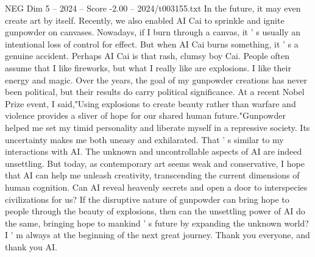 \begin{textsample}{NEG Dim 5 – 2024 – Score -2.00 – 2024/t003155.txt}
In the future, it may even create art by itself.
Recently, we also enabled AI Cai to sprinkle and ignite gunpowder on canvases.
Nowadays, if I burn through a canvas, it ' s usually an intentional loss of control for effect.
But when AI Cai burns something, it ' s a genuine accident.
Perhaps AI Cai is that rash, clumsy boy Cai.
People often assume that I like fireworks, but what I really like are explosions.
I like their energy and magic.
Over the years, the goal of my gunpowder creations has never been political, but their results do carry political significance.
At a recent Nobel Prize event, I said,"Using explosions to create beauty rather than warfare and violence provides a sliver of hope for our shared human future."Gunpowder helped me set my timid personality and liberate myself in a repressive society.
Its uncertainty makes me both uneasy and exhilarated.
That ' s similar to my interactions with AI.
The unknown and uncontrollable aspects of AI are indeed unsettling.
But today, as contemporary art seems weak and conservative, I hope that AI can help me unleash creativity, transcending the current dimensions of human cognition.
Can AI reveal heavenly secrets and open a door to interspecies civilizations for us?
If the disruptive nature of gunpowder can bring hope to people through the beauty of explosions, then can the unsettling power of AI do the same, bringing hope to mankind ' s future by expanding the unknown world?
I ' m always at the beginning of the next great journey.
Thank you everyone, and thank you AI.

\end{textsample}
